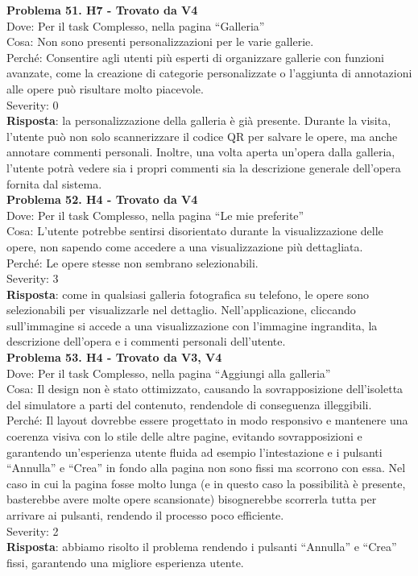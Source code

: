\documentclass{article}
\begin{document}
\noindent \textbf{Problema 51. H7 - Trovato da V4} \\
Dove: Per il task Complesso, nella pagina “Galleria” \\
Cosa: Non sono presenti personalizzazioni per le varie gallerie. \\
Perché: Consentire agli utenti più esperti di organizzare gallerie con funzioni avanzate, come la creazione di categorie personalizzate o l’aggiunta di annotazioni alle opere può risultare molto piacevole. \\
Severity: 0 \\
\textbf{Risposta}: la personalizzazione della galleria è già presente. Durante la visita, l’utente può non solo scannerizzare il codice QR per salvare le opere, ma anche annotare commenti personali. Inoltre, una volta aperta un’opera dalla galleria, l’utente potrà vedere sia i propri commenti sia la descrizione generale dell’opera fornita dal sistema.\\

\noindent \textbf{Problema 52. H4 - Trovato da V4} \\
Dove: Per il task Complesso, nella pagina “Le mie preferite” \\
Cosa: L'utente potrebbe sentirsi disorientato durante la visualizzazione delle opere, non sapendo come accedere a una visualizzazione più dettagliata. \\
Perché: Le opere stesse non sembrano selezionabili. \\
Severity: 3 \\
\textbf{Risposta}: come in qualsiasi galleria fotografica su telefono, le opere sono selezionabili per visualizzarle nel dettaglio. Nell’applicazione, cliccando sull’immagine si accede a una visualizzazione con l’immagine ingrandita, la descrizione dell’opera e i commenti personali dell’utente.\\

\noindent \textbf{Problema 53. H4 - Trovato da V3, V4} \\
Dove: Per il task Complesso, nella pagina “Aggiungi alla galleria” \\
Cosa: Il design non è stato ottimizzato, causando la sovrapposizione dell'isoletta del simulatore a parti del contenuto, rendendole di conseguenza illeggibili. \\
Perché: Il layout dovrebbe essere progettato in modo responsivo e mantenere una coerenza visiva con lo stile delle altre pagine, evitando sovrapposizioni e garantendo un’esperienza utente fluida ad esempio l’intestazione e i pulsanti “Annulla” e “Crea” in fondo alla pagina non sono fissi ma scorrono con essa. Nel caso in cui la pagina fosse molto lunga (e in questo caso la possibilità è presente, basterebbe avere molte opere scansionate) bisognerebbe scorrerla tutta per arrivare ai pulsanti, rendendo il processo poco efficiente. \\
Severity: 2 \\
\textbf{Risposta}: abbiamo risolto il problema rendendo i pulsanti “Annulla” e “Crea” fissi, garantendo una migliore esperienza utente.\\
\end{document}
